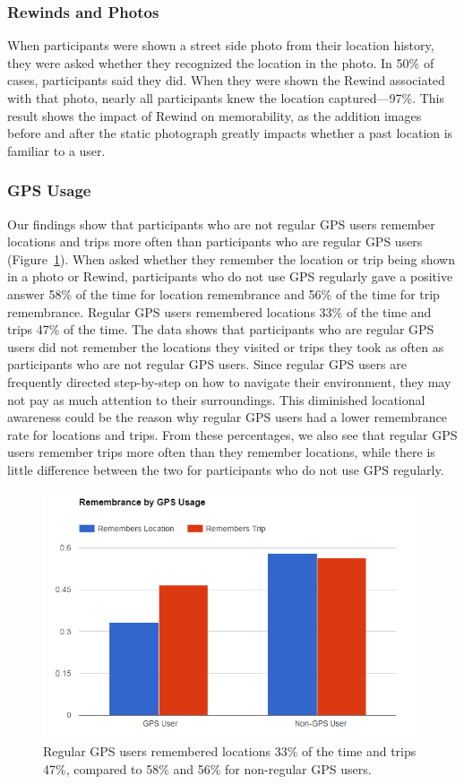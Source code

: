 \documentclass{sigchi}
\begin{document}
\subsubsection{Rewinds and Photos}
When participants were shown a street side photo from their location history, they were asked whether they recognized the location in the photo. In 50\% of cases, participants said they did. When they were shown the Rewind associated with that photo, nearly all participants knew the location captured---97\%. This result shows the impact of Rewind on memorability, as the addition images before and after the static photograph greatly impacts whether a past location is familiar to a user.

\subsubsection{GPS Usage}
Our findings show that participants who are not regular GPS users remember locations and trips more often than participants who are regular GPS users (Figure~\ref{fig:gpsmemory}). When asked whether they remember the location or trip being shown in a photo or Rewind, participants who do not use GPS regularly gave a positive answer 58\% of the time for location remembrance and 56\% of the time for trip remembrance. Regular GPS users remembered locations 33\% of the time and trips 47\% of the time. The data shows that participants who are regular GPS users did not remember the locations they visited or trips they took as often as participants who are not regular GPS users. Since regular GPS users are frequently directed step-by-step on how to navigate their environment, they may not pay as much attention to their surroundings. This diminished locational awareness could be the reason why regular GPS users had a lower remembrance rate for locations and trips. From these percentages, we also see that regular GPS users remember trips more often than they remember locations, while there is little difference between the two for participants who do not use GPS regularly. 

\begin{figure}
   \centering
     \includegraphics[width=1\linewidth]{GPS_remembrance_2}
     \caption{Regular GPS users remembered locations 33\% of the time and trips 47\%, compared to 58\% and 56\% for non-regular GPS users.}
     \label{fig:gpsmemory}
\end{figure}
\end{document}
